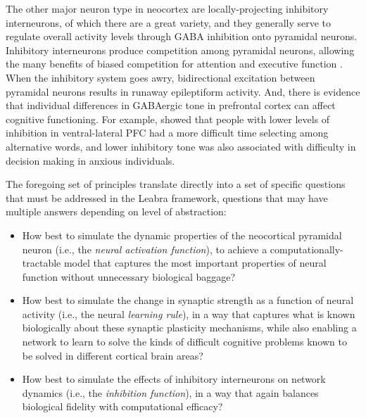 \documentclass[11pt,twoside]{article}
\begin{document}
The other major neuron type in neocortex are locally-projecting inhibitory
interneurons, of which there are a great variety, and they generally serve to
regulate overall activity levels through GABA inhibition onto pyramidal
neurons.  Inhibitory interneurons produce competition among pyramidal neurons,
allowing the many benefits of biased competition for attention and executive
function \cite{DesimoneDuncan95,HerdBanichOReilly06}.  When the inhibitory
system goes awry, bidirectional excitation between pyramidal neurons results
in runaway epileptiform activity. And, there is evidence that individual
differences in GABAergic tone in prefrontal cortex can affect cognitive
functioning.  For example,  showed that
people with lower levels of inhibition in ventral-lateral PFC had a more
difficult time selecting among alternative words, and lower inhibitory tone
was also associated with difficulty in decision making in anxious individuals.

The foregoing set of principles translate directly into a set of specific
questions that must be addressed in the Leabra framework, questions that may
have multiple answers depending on level of abstraction:
\begin{itemize}
\item How best to simulate the dynamic properties of the neocortical pyramidal
  neuron (i.e., the {\em neural activation function}), to achieve a
  computationally-tractable model that captures the most important properties
  of neural function without unnecessary biological baggage?
\item How best to simulate the change in synaptic strength as a function of
  neural activity (i.e., the neural {\em learning rule}), in a way that
  captures what is known biologically about these synaptic plasticity
  mechanisms, while also enabling a network to learn to solve the kinds of
  difficult cognitive problems known to be solved in different cortical brain
  areas?
\item How best to simulate the effects of inhibitory interneurons on network
  dynamics (i.e., the {\em inhibition function}), in a way that again balances
  biological fidelity with computational efficacy?
\end{itemize}
\end{document}
